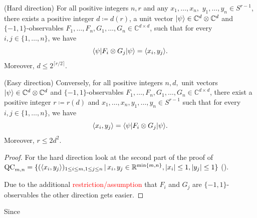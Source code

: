 	\begin{frame}
		\begin{theo}[Tsirelson] \label{theo:Tsirelson}
			(Hard direction) For all positive integers $n, r$ and any $x_1,\dots,x_n,$ $y_1,\dots,y_n\in S^{r-1}$, there exists a positive integer $d\coloneqq d(r)$, a unit vector $\vert {\psi} \rangle\in\mathbb{C}^d\otimes\mathbb{C}^d$ and $\{-1,1\}$-observables $F_1,\dots,F_n,G_1,\dots,G_n\in \mathbb{C}^{d\times d}$, such that for every $i,j\in\{1,\dots,n\}$, we have
			\begin{equation}
				\langle {\psi} \vert F_i\otimes G_j \vert {\psi} \rangle = \langle{x_i},{y_j}\rangle.
			\end{equation}
			Moreover, $d\leq 2^{\lceil r/2 \rceil}$.
			
			(Easy direction) Conversely, for all positive integers $n,d,$ unit vectors $\vert {\psi} \rangle\in \mathbb{C}^d\otimes\mathbb{C}^d$ and $\{-1,1\}$-observables $F_1,\dots,F_n,G_1,\dots,G_n\in \mathbb{C}^{d\times d}$, there exist a positive integer $r\coloneqq r(d)$ and $x_1,\dots,x_n,y_1,\dots,y_n\in S^{r-1}$ such that for every $i,j\in\{1,\dots,n\}$, we have
			\begin{equation}
				\langle{x_i},{y_j}\rangle = \langle {\psi} \vert F_i\otimes G_j \vert {\psi} \rangle.
			\end{equation}
			Moreover, $r\leq 2d^2$.
		\end{theo}
	\end{frame}
	\begin{frame}
		\begin{proof}
			For the hard direction look at the second part of the proof of $\textup{QC}_{m,n} = \{(\langle{x_i},{y_j}\rangle)_{1\leq i\leq m, 1\leq j \leq n} \,| \, x_i,y_j \in \mathbb{R}^{\min\{m,n\}}, {\left|{x_i}\right|}\leq 1, {\left|{y_j}\right|}\leq 1\}$ (\hyperlink{Tsirelson}{\beamerreturnbutton{Lemma}}).
			
			Due to the additional \textcolor{red}{restriction/assumption} that $F_i$ and $G_j$ are $\{-1,1\}$-observables the other direction gets easier.
			
		\end{proof}
	\end{frame}

	\begin{frame}
		Since 
	\end{frame}
